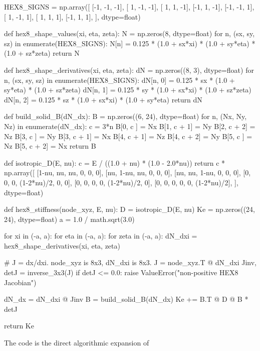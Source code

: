 \begin{python}
HEX8_SIGNS = np.array([
    [-1, -1, -1],
    [ 1, -1, -1],
    [ 1,  1, -1],
    [-1,  1, -1],
    [-1, -1,  1],
    [ 1, -1,  1],
    [ 1,  1,  1],
    [-1,  1,  1],
], dtype=float)


def hex8_shape_values(xi, eta, zeta):
    N = np.zeros(8, dtype=float)
    for n, (sx, sy, sz) in enumerate(HEX8_SIGNS):
        N[n] = 0.125 * (1.0 + sx*xi) * (1.0 + sy*eta) * (1.0 + sz*zeta)
    return N


def hex8_shape_derivatives(xi, eta, zeta):
    dN = np.zeros((8, 3), dtype=float)
    for n, (sx, sy, sz) in enumerate(HEX8_SIGNS):
        dN[n, 0] = 0.125 * sx * (1.0 + sy*eta) * (1.0 + sz*zeta)
        dN[n, 1] = 0.125 * sy * (1.0 + sx*xi) * (1.0 + sz*zeta)
        dN[n, 2] = 0.125 * sz * (1.0 + sx*xi) * (1.0 + sy*eta)
    return dN


def build_solid_B(dN_dx):
    B = np.zeros((6, 24), dtype=float)
    for n, (Nx, Ny, Nz) in enumerate(dN_dx):
        c = 3*n
        B[0, c    ] = Nx
        B[1, c + 1] = Ny
        B[2, c + 2] = Nz
        B[3, c    ] = Ny
        B[3, c + 1] = Nx
        B[4, c + 1] = Nz
        B[4, c + 2] = Ny
        B[5, c    ] = Nz
        B[5, c + 2] = Nx
    return B


def isotropic_D(E, nu):
    c = E / ((1.0 + nu) * (1.0 - 2.0*nu))
    return c * np.array([
        [1-nu, nu, nu, 0, 0, 0],
        [nu, 1-nu, nu, 0, 0, 0],
        [nu, nu, 1-nu, 0, 0, 0],
        [0, 0, 0, (1-2*nu)/2, 0, 0],
        [0, 0, 0, 0, (1-2*nu)/2, 0],
        [0, 0, 0, 0, 0, (1-2*nu)/2],
    ], dtype=float)


def hex8_stiffness(node_xyz, E, nu):
    D = isotropic_D(E, nu)
    Ke = np.zeros((24, 24), dtype=float)
    a = 1.0 / math.sqrt(3.0)

    for xi in (-a, a):
        for eta in (-a, a):
            for zeta in (-a, a):
                dN_dxi = hex8_shape_derivatives(xi, eta, zeta)

                # J = dx/dxi.  node_xyz is 8x3, dN_dxi is 8x3.
                J = node_xyz.T @ dN_dxi
                Jinv, detJ = inverse_3x3(J)
                if detJ <= 0.0:
                    raise ValueError("non-positive HEX8 Jacobian")

                dN_dx = dN_dxi @ Jinv
                B = build_solid_B(dN_dx)
                Ke += B.T @ D @ B * detJ

    return Ke
\end{python}

The code is the direct algorithmic expansion of

